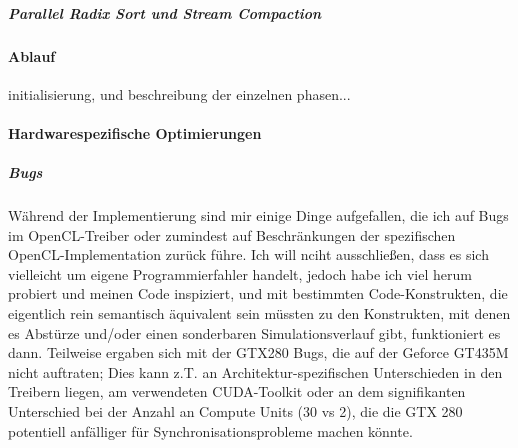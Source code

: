 		\subparagraph{Parallel Radix Sort und Stream Compaction}
		
	\paragraph{Ablauf}
		\label{sec:fluidSim:ablauf}
		initialisierung, und beschreibung der einzelnen phasen...

	\paragraph{Hardwarespezifische Optimierungen}
	\label{sec:hardwareOptimizations}
	
	
		\subparagraph{Bugs}
		\label{sec:oclBugs}
		Während der Implementierung sind mir einige Dinge aufgefallen, die ich auf Bugs im OpenCL-Treiber
		oder zumindest auf Beschränkungen der spezifischen OpenCL-Implementation zurück führe.
		Ich will nciht ausschließen, dass es sich vielleicht um eigene Programmierfahler handelt, jedoch habe ich
		viel herum probiert und meinen Code inspiziert, und mit bestimmten Code-Konstrukten, die eigentlich
		rein semantisch äquivalent sein müssten zu den Konstrukten, mit denen es Abstürze und/oder einen sonderbaren
		Simulationsverlauf gibt, funktioniert es dann.
		Teilweise ergaben sich mit der GTX280 Bugs, die auf der Geforce GT435M nicht auftraten;
		Dies kann z.T. an Architektur-spezifischen Unterschieden in den Treibern liegen, am verwendeten
		CUDA-Toolkit oder an dem signifikanten Unterschied bei der Anzahl an Compute Units (30 vs 2), die die
		GTX 280 potentiell anfälliger für Synchronisationsprobleme machen könnte.
		
